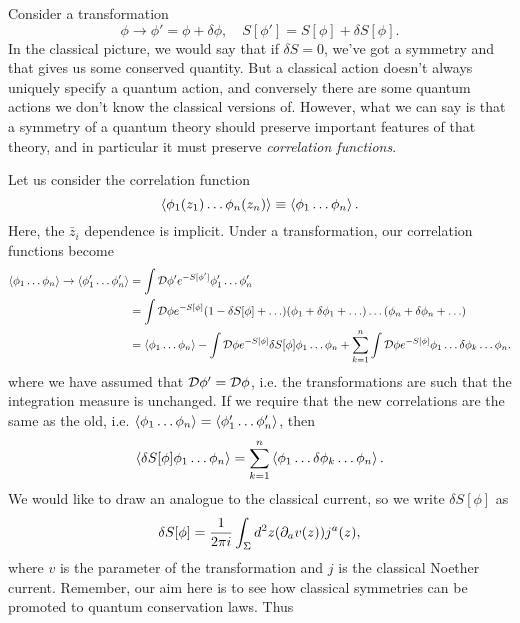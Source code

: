 Consider a transformation
\begin{equation}
    \phi \to \phi'=\phi+\delta \phi, \quad S[\phi']=S[\phi]+\delta S[\phi].
\end{equation}
In the classical picture, we would say that if $\delta S=0$, we've got a symmetry and that gives us some conserved quantity. But a classical action doesn't always uniquely specify a quantum action, and conversely there are some quantum actions we don't know the classical versions of. However, what we can say is that a symmetry of a quantum theory should preserve important features of that theory, and in particular it must preserve \emph{correlation functions}.

Let us consider the correlation function
\begin{equation*}
    \left< \phi_1(z_1)\ldots \phi_n(z_n) \right> \equiv \left< \phi_1\ldots \phi_n \right>.
\end{equation*}
Here, the $\bar z_i$ dependence is implicit. Under a transformation, our correlation functions become
\begin{align*}
    \left< \phi_1\ldots \phi_n \right>\to \left< \phi_1'\ldots \phi_n' \right> &=\int \mathcal{D} \phi' e^{-S[\phi']}\phi_1' \ldots \phi_n'\\
        &= \int \mathcal{D} \phi e^{-S[\phi]}(1-\delta S[\phi]+\ldots)(\phi_1 +\delta\phi_1 +\ldots)\ldots (\phi_n+\delta\phi_n+\ldots)\\
        &= \left< \phi_1 \ldots \phi_n \right>-\int \mathcal{D} \phi e^{-S[\phi]}\delta S[\phi] \phi_1\ldots \phi_n + \sum_{k=1}^n \int \mathcal{D} \phi e^{-S[\phi]}\phi_1 \ldots \delta \phi_k \ldots \phi_n.
\end{align*}
where we have assumed that $\mathcal{D}\phi'=\mathcal{D} \phi$, i.e. the transformations are such that the integration measure is unchanged. If we require that the new correlations are the same as the old, i.e. $\left< \phi_1\ldots \phi_n \right> = \left< \phi_1'\ldots \phi_n' \right>$, then
\begin{equation}
    \left< \delta S[\phi]\phi_1\ldots \phi_n \right>=\sum_{k=1}^n \left< \phi_1 \ldots \delta \phi_k \ldots \phi_n \right>.
\end{equation}
We would like to draw an analogue to the classical current, so we write $\delta S[\phi]$ as
\begin{equation}
    \delta S[\phi]=\frac{1}{2\pi i}\int_\Sigma d^2 z (\partial_a v(z))j^a(z),
\end{equation}
where $v$ is the parameter of the transformation and $j$ is the classical Noether current. Remember, our aim here is to see how classical symmetries can be promoted to quantum conservation laws. Thus
